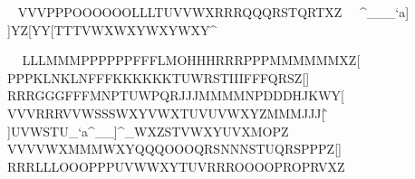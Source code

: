                                                       VVVPPPOOOOOOLLLTUVVWXRRRQQQRSTQRTXZ\                                                      ^___`a\]]\\]YZ[YY[TTTVWXWXYWXYWXY\]^

                                                      
LLLMMMPPPPPPFFFLMOHHHRRRPPPMMMMMMXZ[                                                      
PPPKLNKLNFFFKKKKKKTUWRSTIIIFFFQRSZ[]                                                      
RRRGGGFFFMNPTUWPQRJJJMMMMNPDDDHJKWY[                                                      
VVVRRRVVWSSSWXYVWXTUVUVWXYZMMMJJJ[\^                                                      
\]]UVWSTU_`a^__]^_WXZSTVWXYUVXMOPZ\]                                                      
VVVVWXMMMWXYQQQOOOQRSNNNSTUQRSPPPZ[]                                                      
RRRLLLOOOPPPUVWWXYTUVRRROOOOPROPRVXZ                                                      
